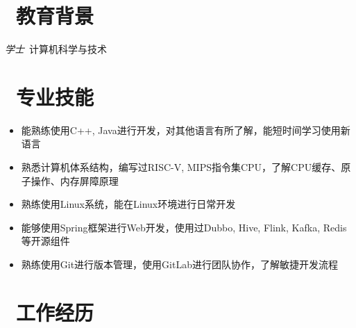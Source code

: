\documentclass{resume}
\begin{document}



\section{\texorpdfstring{\faGraduationCap\ 教育背景}{教育背景}}
\textit{学士}\ 计算机科学与技术

\section{\texorpdfstring{\faCogs\ 专业技能}{专业技能}}
\begin{itemize}[parsep=0.5ex]
  \item 能熟练使用C++, Java进行开发，对其他语言有所了解，能短时间学习使用新语言
  \item 熟悉计算机体系结构，编写过RISC-V, MIPS指令集CPU，了解CPU缓存、原子操作、内存屏障原理
  \item 熟练使用Linux系统，能在Linux环境进行日常开发
  \item 能够使用Spring框架进行Web开发，使用过Dubbo, Hive, Flink, Kafka, Redis等开源组件
  \item 熟练使用Git进行版本管理，使用GitLab进行团队协作，了解敏捷开发流程
\end{itemize}

\section{\texorpdfstring{\faUsers\ 工作经历}{工作经历}}
\end{document}
